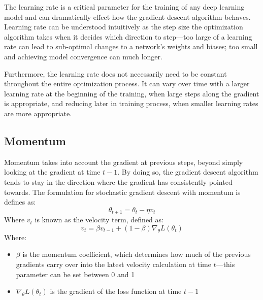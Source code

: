 \documentclass [MS] {uclathes}
\begin{document}
The learning rate is a critical parameter for the training of any deep learning model and can dramatically effect how 
the gradient descent algorithm behaves. Learning rate can be understood intuitively as the step size the optimization 
algorithm takes when it decides which direction to step---too large of a learning rate can lead to sub-optimal changes 
to a network's weights and biases; too small and achieving model convergence can much longer.

Furthermore, the learning rate does not necessarily need to be constant throughout the entire optimization process. It 
can vary over time with a larger learning rate at the beginning of the training, when large steps along the gradient is 
appropriate, and reducing later in training process, when smaller learning rates are more appropriate.

\subsection{Momentum}
Momentum takes into account the gradient at previous steps, beyond simply looking at the gradient at time \(t-1\). By 
doing so, the gradient descent algorithm tends to stay in the direction where the gradient has consistently pointed 
towards. The formulation for stochastic gradient descent with momentum is defines as:
\[\theta_{t+1} = \theta_{t} - \eta v_{t}\]
Where \(v_{t}\) is known as the velocity term, defined as:
\[v_{t} = \beta v_{t-1} + (1 - \beta) \nabla_{\theta} L(\theta_{t})\]
Where:
\begin{itemize}
    \item \(\beta\) is the momentum coefficient, which determines how much of the previous gradients carry over into the 
    latest velocity calculation at time \(t\)---this parameter can be set between 0 and 1
    \item \(\nabla_{\theta} L(\theta_{t})\) is the gradient of the loss function at time \(t-1\)
\end{itemize}
\end{document}

